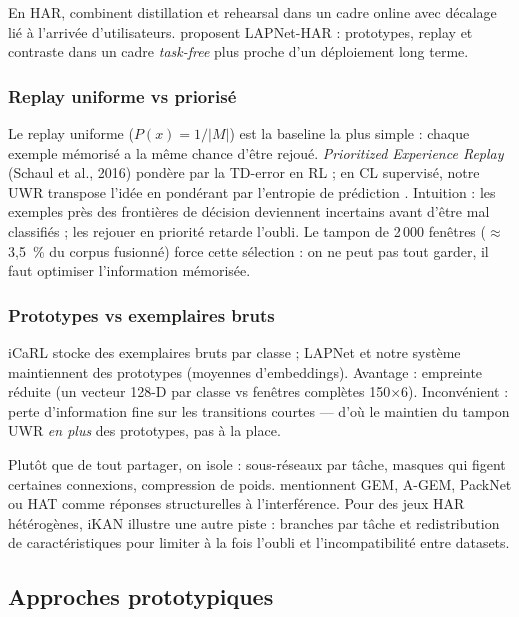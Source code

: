 \documentclass[a4paper,12pt]{report}
\begin{document}
En HAR, \textcite{schiemer2023} combinent distillation et rehearsal dans un
cadre online avec décalage lié à l'arrivée d'utilisateurs.
\textcite{adaimi2022} proposent LAPNet-HAR : prototypes, replay et contraste
dans un cadre \emph{task-free} plus proche d'un déploiement long terme.

\subsubsection{Replay uniforme vs priorisé}

Le replay uniforme ($P(x)=1/|M|$) est la baseline la plus simple : chaque
exemple mémorisé a la même chance d'être rejoué. \emph{Prioritized Experience
Replay} (Schaul et al., 2016) pondère par la TD-error en RL ; en CL supervisé,
notre UWR transpose l'idée en pondérant par l'entropie de prédiction
\parencite{gal2016}. Intuition : les exemples près des frontières de décision
deviennent incertains avant d'être mal classifiés ; les rejouer en priorité
retarde l'oubli. Le tampon de 2\,000 fenêtres ($\approx$ 3,5~\% du corpus
fusionné) force cette sélection : on ne peut pas tout garder, il faut optimiser
l'information mémorisée.

\subsubsection{Prototypes vs exemplaires bruts}

iCaRL stocke des exemplaires bruts par classe ; LAPNet et notre système
maintiennent des prototypes (moyennes d'embeddings). Avantage : empreinte réduite
(un vecteur 128-D par classe vs fenêtres complètes 150$\times$6). Inconvénient :
perte d'information fine sur les transitions courtes — d'où le maintien du tampon
UWR \emph{en plus} des prototypes, pas à la place.


Plutôt que de tout partager, on isole : sous-réseaux par tâche, masques qui
figent certaines connexions, compression de poids. \textcite{delange2021}
mentionnent GEM, A-GEM, PackNet ou HAT comme réponses structurelles à
l'interférence. Pour des jeux HAR hétérogènes, iKAN \parencite{liu2024}
illustre une autre piste : branches par tâche et redistribution de
caractéristiques pour limiter à la fois l'oubli et l'incompatibilité entre
datasets.

\subsection{Approches prototypiques}
\end{document}
